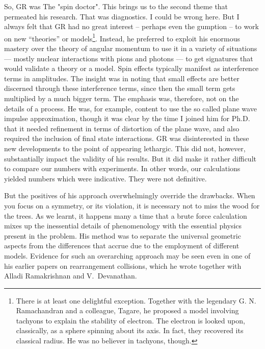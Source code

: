 So, GR was The "spin doctor". This brings us to the second theme that permeated his research. That was diagnostics. I could be wrong here. But I always felt that GR had no great interest -- perhaps even the gumption -- to work on new “theories” or models\footnote{There is at least one delightful exception. Together with the legendary G. N. Ramachandran and a colleague, Tagare, he proposed a model involving tachyons to explain the stability of electron. The electron is looked upon, classically, as a sphere spinning about its axis. In fact, they recovered its classical radius.  He was no believer in tachyons, though.}. Instead, he preferred to exploit his enormous mastery over the theory of angular momentum to use it in a variety of situations --- mostly nuclear interactions with pions and photons — to get signatures that would validate a theory or a model. Spin effects typically manifest as interference terms in amplitudes. The insight was in noting that small effects are better discerned through these interference terms, since then the small term gets multiplied by a much bigger term.  The emphasis was, therefore, not on the details of a process. He was, for example, content to use the so called plane wave impulse approximation, though it was clear by the time I joined him for Ph.D. that it needed refinement in terms of distortion of the plane wave, and also required the inclusion of final state interactions. GR was disinterested in these new developments to the point of appearing lethargic. This did not, however, substantially impact the validity of his results. But it did make it rather difficult to compare our numbers with experiments. In other words, our calculations yielded numbers which were indicative. They were not definitive.

But the positives of his approach overwhelmingly override the drawbacks. When you focus on a symmetry, or its violation, it is necessary not to miss the wood for the trees. As we learnt, it happens many a time that a brute force calculation mixes up the inessential details of phenomenology with the essential physics present in the problem. His method was to separate the universal geometric aspects from the differences that accrue due to the employment of different models. Evidence for such an overarching approach may be seen even in one of his earlier papers on rearrangement collisions, which he wrote together with Alladi Ramakrishnan and V.\ Devanathan.

